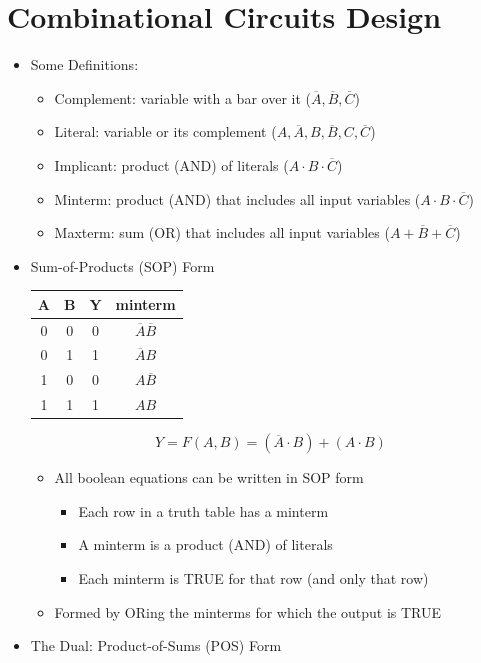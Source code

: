 \documentclass[a4paper]{article}
\begin{document}
\section{Combinational Circuits Design}
\begin{itemize}
\item Some Definitions:
\begin{itemize}
\item Complement: variable with a bar over it ($\overline{A},\overline{B},\overline{C}$)
\item Literal: variable or its complement ($A,\overline{A},B,\overline{B},C,\overline{C}$)
\item Implicant: product (AND) of literals ($A\cdot B\cdot \overline{C}$)
\item Minterm: product (AND) that includes all input variables ($A\cdot B \cdot \overline{C}$)
\item Maxterm: sum (OR) that includes all input variables ($A+\overline{B}+\overline{C}$)
\end{itemize}
\item Sum-of-Products (SOP) Form
\begin{center}
\begin{tabular}{c c|c|c}
A&B&Y&minterm\\\hline
0&0&0&$\overline{A}\overline{B}$\\
0&1&1&$\overline{A}B$\\
1&0&0&$A\overline{B}$\\
1&1&1&$AB$
\end{tabular}
$$Y=F(A,B)=(\overline{A}\cdot B)+(A\cdot B)$$
\end{center}
\begin{itemize}
\item All boolean equations can be written in SOP form
\begin{itemize}
\item Each row in a truth table has a minterm
\item A minterm is a product (AND) of literals
\item Each minterm is TRUE for that row (and only that row)
\end{itemize}
\item Formed by ORing the minterms for which the output is TRUE
\end{itemize}
\item The Dual: Product-of-Sums (POS) Form
\begin{center}

\end{center}
\end{itemize}
\end{document}
